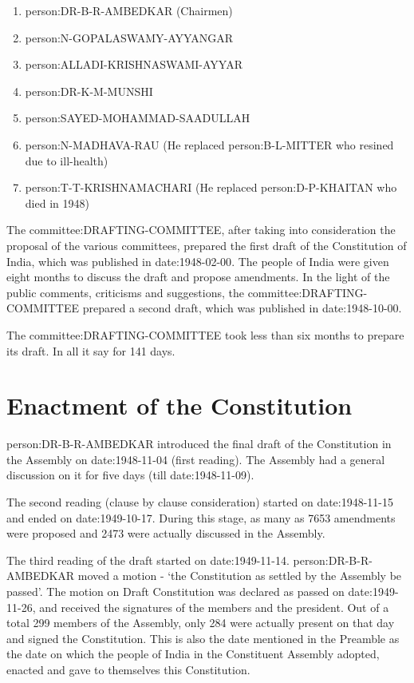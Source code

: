 \begin{multicol}{2}
\begin{enumerate}
  \item \gls{person:DR-B-R-AMBEDKAR} ({ Chairmen})
  \item \gls{person:N-GOPALASWAMY-AYYANGAR}
  \item \gls{person:ALLADI-KRISHNASWAMI-AYYAR}
  \item \gls{person:DR-K-M-MUNSHI}
  \item \gls{person:SAYED-MOHAMMAD-SAADULLAH}
  \item \gls{person:N-MADHAVA-RAU} (He replaced \gls{person:B-L-MITTER} who resined due to ill-health)
  \item \gls{person:T-T-KRISHNAMACHARI} (He replaced \gls{person:D-P-KHAITAN} who died in 1948)
\end{enumerate}

The \gls{committee:DRAFTING-COMMITTEE}, after taking into consideration the proposal of the various committees, prepared the first draft of the Constitution of India, which was published in \gls{date:1948-02-00}. The people of India were given eight months to discuss the draft and propose amendments. In the light of the public comments, criticisms and suggestions, the \gls{committee:DRAFTING-COMMITTEE} prepared a second draft, which was published in \gls{date:1948-10-00}.

The \gls{committee:DRAFTING-COMMITTEE} took less than six months to prepare its draft. In all it say for 141 days.

\section{Enactment of the Constitution}

\gls{person:DR-B-R-AMBEDKAR} introduced the final draft of the Constitution in the Assembly on \gls{date:1948-11-04} (first reading). The Assembly had a general discussion on it for five days (till \gls{date:1948-11-09}).

The second reading (clause by clause consideration) started on \gls{date:1948-11-15} and ended on \gls{date:1949-10-17}. During this stage, as many as 7653 amendments were proposed and 2473 were actually discussed in the Assembly.

The third reading of the draft started on \gls{date:1949-11-14}. \gls{person:DR-B-R-AMBEDKAR} moved a motion - `the Constitution as settled by the Assembly be passed'. The motion on Draft Constitution was declared as passed on \gls{date:1949-11-26}, and received the signatures of the members and the president. Out of a total 299 members of the Assembly, only 284 were actually present on that day and signed the Constitution. This is also the date mentioned in the Preamble as the date on which the people of India in the Constituent Assembly adopted, enacted and gave to themselves this Constitution.


\end{multicol}
